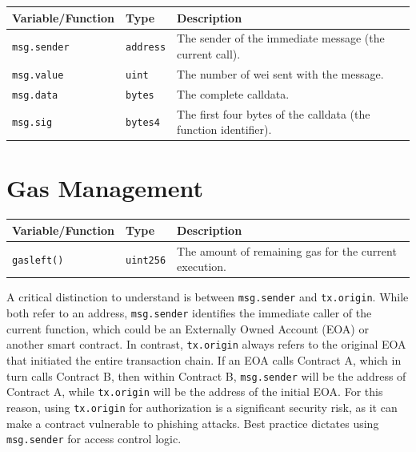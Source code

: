 \documentclass{scrbook}
\begin{document}
\begin{table}[h!]
    \centering
    \begin{tabular}{|p{}|p{}|p{}|}
        \hline
        Variable/Function & Type & Description \\ \hline
        \texttt{msg.sender} & \texttt{address} & The sender of the immediate message (the current call). \\ \hline
        \texttt{msg.value} & \texttt{uint} & The number of wei sent with the message. \\ \hline
        \texttt{msg.data} & \texttt{bytes} & The complete calldata. \\ \hline
        \texttt{msg.sig} & \texttt{bytes4} & The first four bytes of the calldata (the function identifier). \\ \hline
    \end{tabular}
\end{table}

\section{Gas Management}

\begin{table}[h!]
    \centering
    \begin{tabular}{|p{}|p{}|p{}|}
        \hline
        Variable/Function & Type & Description \\ \hline
        \texttt{gasleft()} & \texttt{uint256} & The amount of remaining gas for the current execution. \\ \hline
    \end{tabular}
\end{table}

A critical distinction to understand is between \texttt{msg.sender} and \texttt{tx.origin}. While both refer to an address, \texttt{msg.sender} identifies the immediate caller of the current function, which could be an Externally Owned Account (EOA) or another smart contract. In contrast, \texttt{tx.origin} always refers to the original EOA that initiated the entire transaction chain. If an EOA calls Contract A, which in turn calls Contract B, then within Contract B, \texttt{msg.sender} will be the address of Contract A, while \texttt{tx.origin} will be the address of the initial EOA. For this reason, using \texttt{tx.origin} for authorization is a significant security risk, as it can make a contract vulnerable to phishing attacks. Best practice dictates using \texttt{msg.sender} for access control logic.\\
\end{document}
